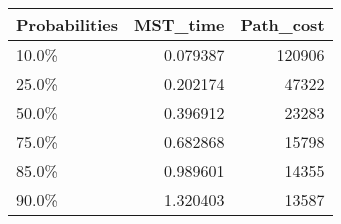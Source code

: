 \begin{tabular}{lrr}
\toprule
Probabilities &  MST\_time &  Path\_cost \\
\midrule
        10.0\% &  0.079387 &     120906 \\
        25.0\% &  0.202174 &      47322 \\
        50.0\% &  0.396912 &      23283 \\
        75.0\% &  0.682868 &      15798 \\
        85.0\% &  0.989601 &      14355 \\
        90.0\% &  1.320403 &      13587 \\
\bottomrule
\end{tabular}
